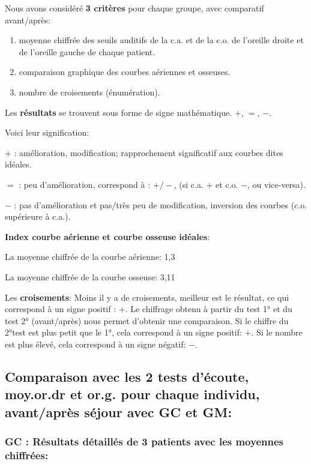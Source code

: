 Nous avons considéré \textbf{ 3 critères} pour chaque groupe, avec comparatif avant/après:
\begin{enumerate}
 \item  moyenne chiffrée des seuils
auditifs de la c.a. et de la c.o. de l'oreille droite et de l'oreille gauche de chaque patient.

\item comparaison graphique des courbes aériennes et osseuses.

\item  nombre de croisements (énumération).
\end{enumerate}

Les \textbf{résultats} se trouvent sous forme de signe mathématique. $+$, $=$, $-$.

Voici leur signification:

$+$   : amélioration, modification;  rapprochement significatif aux courbes dites idéales.

$=$   : peu d'amélioration, correspond à : $+/-$, (si c.a. $ + $ et c.o. $-$, ou vice-versa).

$-$   : pas d'amélioration et pas/très peu  de modification, inversion des courbes (c.o. supérieure à c.a.).

\textbf{Index courbe aérienne et courbe osseuse idéales}:

La moyenne chiffrée de la courbe aérienne: 1,3


La moyenne chiffrée de la courbe osseuse: 3,11

Les \textbf{croisements}:
Moins il y a de croisements, meilleur est le résultat, ce qui correspond à un signe positif : $+$.
Le chiffrage obtenu à partir du test 1° et du test 2° (avant/après) nous permet d'obtenir une comparaison.
Si le chiffre du 2°test est plus petit que le 1°, cela correspond à un signe positif: $+$.
Si le nombre est plus élevé, cela correspond à un signe négatif: $-$.

   
      \subsection{ Comparaison avec les 2 tests d'écoute, moy.or.dr et or.g. pour chaque individu,
       avant/après séjour avec GC et GM:
       }

       \subsubsection{ GC : Résultats détaillés de 3 patients avec les moyennes chiffrées:}



